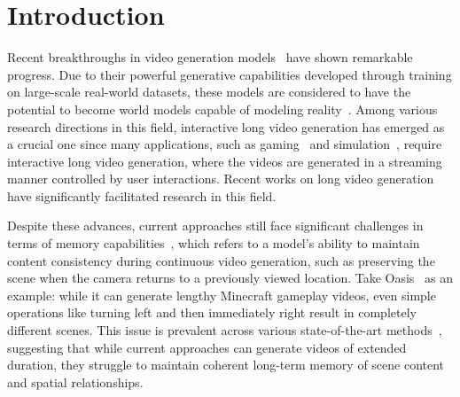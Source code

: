 \section{Introduction}
\label{sec:intro}
Recent breakthroughs in video generation models~\cite{sora,runway,cogvideox,wan,hunyuanvideo} have shown remarkable progress. Due to their powerful generative capabilities developed through training on large-scale real-world datasets, these models are considered to have the potential to become world models capable of modeling reality~\cite{sora,video-new-language,unisim,worldsimbench}. 
Among various research directions in this field, interactive long video generation has emerged as a crucial one since many applications, such as gaming~\cite{genie2,gamengine,gamefactory} and simulation~\cite{gaia-1,vista,gaia-2}, require interactive long video generation, where the videos are generated in a streaming manner controlled by user interactions.
Recent works on long video generation~\cite{cdf,dfot,videopoet,emu3,nova,far,framepack} have significantly facilitated research in this field.

Despite these advances, current approaches still face significant challenges in terms of memory capabilities~\cite{igv-position,igv-survey}, which refers to a model's ability to maintain content consistency during continuous video generation, such as preserving the scene when the camera returns to a previously viewed location. Take Oasis~\cite{oasis} as an example: while it can generate lengthy Minecraft gameplay videos, even simple operations like turning left and then immediately right result in completely different scenes. This issue is prevalent across various state-of-the-art methods~\cite{gamengine,wham,dfot,gamefactory}, suggesting that while current approaches can generate videos of extended duration, they struggle to maintain coherent long-term memory of scene content and spatial relationships.

